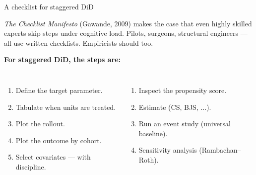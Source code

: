 \documentclass[aspectratio=169,12pt,t]{beamer}
\begin{document}

\begin{frame}{A checklist for staggered DiD}
\vspace{0.3cm}

\textit{The Checklist Manifesto} (Gawande, 2009) makes the case that even highly skilled experts skip steps under cognitive load. \;Pilots, surgeons, structural engineers --- all use written checklists. \;Empiricists should too.

\vspace{0.4cm}

\textbf{For staggered DiD, the steps are:}
\vspace{0.1cm}
\begin{columns}[T,onlytextwidth]
\begin{enumerate}\small\setlength\itemsep{1pt}
  \item Define the target parameter.
  \item Tabulate when units are treated.
  \item Plot the rollout.
  \item Plot the outcome by cohort.
  \item Select covariates --- with discipline.
\end{enumerate}
\begin{enumerate}\small\setlength\itemsep{1pt}\setcounter{enumi}{5}
  \item Inspect the propensity score.
  \item Estimate (CS, BJS, $\ldots$).
  \item Run an event study (universal baseline).
  \item Sensitivity analysis (Rambachan--Roth).
\end{enumerate}
\end{columns}
\end{frame}

\end{document}
